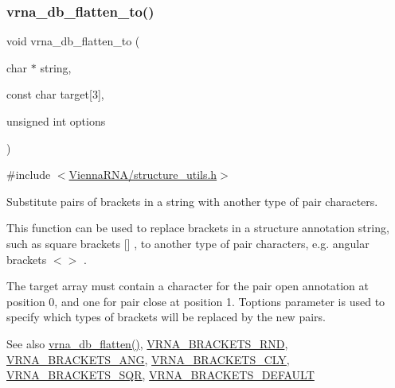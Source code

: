 \subsubsection{\texorpdfstring{vrna\+\_\+db\+\_\+flatten\+\_\+to()}{vrna\_db\_flatten\_to()}}
{\footnotesize\ttfamily void vrna\+\_\+db\+\_\+flatten\+\_\+to (\begin{DoxyParamCaption}\item[{char $\ast$}]{string,  }\item[{const char}]{target\mbox{[}3\mbox{]},  }\item[{unsigned int}]{options }\end{DoxyParamCaption})}



{\ttfamily \#include $<$\hyperlink{structure__utils_8h}{Vienna\+R\+N\+A/structure\+\_\+utils.\+h}$>$}



Substitute pairs of brackets in a string with another type of pair characters. 

This function can be used to replace brackets in a structure annotation string, such as square brackets  \mbox{[}\mbox{]}  , to another type of pair characters, e.\+g. angular brackets  $<$$>$ .

The {\ttfamily target} array must contain a character for the \textquotesingle{}pair open\textquotesingle{} annotation at position 0, and one for \textquotesingle{}pair close\textquotesingle{} at position 1. T{\ttfamily options} parameter is used to specify which types of brackets will be replaced by the new pairs.

\begin{DoxySeeAlso}{See also}
\hyperlink{group__struct__utils_gae966b9f44168a4f4b39ca42ffb5f37b7}{vrna\+\_\+db\+\_\+flatten()}, \hyperlink{group__struct__utils_gac92d5fa7c6625bce2670ece510a24fbd}{V\+R\+N\+A\+\_\+\+B\+R\+A\+C\+K\+E\+T\+S\+\_\+\+R\+ND}, \hyperlink{group__struct__utils_ga863e03f7f73f10fc9bbcbefbdda4bec8}{V\+R\+N\+A\+\_\+\+B\+R\+A\+C\+K\+E\+T\+S\+\_\+\+A\+NG}, \hyperlink{group__struct__utils_gaf41be40e79cb756c4e0bb8edb4d803d2}{V\+R\+N\+A\+\_\+\+B\+R\+A\+C\+K\+E\+T\+S\+\_\+\+C\+LY}, \hyperlink{group__struct__utils_ga60525d61d7496eeea490a37f3d6bf757}{V\+R\+N\+A\+\_\+\+B\+R\+A\+C\+K\+E\+T\+S\+\_\+\+S\+QR}, \hyperlink{group__struct__utils_ga559ebf76b1b289f85309f4206e99aa1a}{V\+R\+N\+A\+\_\+\+B\+R\+A\+C\+K\+E\+T\+S\+\_\+\+D\+E\+F\+A\+U\+LT}
\end{DoxySeeAlso}

